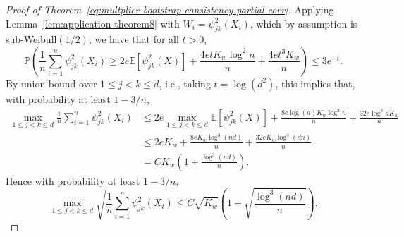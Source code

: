 \documentclass[11pt]{article}
\begin{document}
\begin{appendices}
\begin{proof}[Proof of Theorem~\ref{eq:multplier-bootstrap-consistency-partial-corr}]
Applying Lemma~\ref{lem:application-theorem8} with $W_i = \psi_{jk}^2(X_i)$, which by assumption is sub-Weibull$(1/2)$, we have that for all $t > 0$,
\[
\mathbb{P}\left(\frac{1}{n}\sum_{i=1}^n \psi_{jk}^2(X_i) \ge 2e\mathbb{E}\left[\psi_{jk}^2(X)\right] + \frac{4etK_w\log^2n}{n} + \frac{4et^3K_w}{n}\right) \le 3e^{-t}.
\]
By union bound over $1\le j < k\le d$, i.e., taking $t = \log(d^2)$, this implies that, with probability at least $1 - 3/n$,
\begin{align*}
\max_{1\le j < k\le d}\frac{1}{n}\sum_{i=1}^n \psi_{jk}^2(X_i) &\le 2e\max_{1\le j < k\le d}\mathbb{E}\left[\psi_{jk}^2(X)\right] + \frac{8e\log(d)K_w\log^2n}{n} + \frac{32e\log^3dK_w}{n}\\
&\le 2eK_w + \frac{8eK_w\log^3(nd)}{n} + \frac{32eK_w\log^3(dn)}{n}\\
&= CK_w\left(1 + \frac{\log^3(nd)}{n}\right). 
\end{align*}
Hence with probability at least $1 - 3/n$,
\begin{equation}\label{eq:square-power-psi}
\max_{1\le j < k\le d}\sqrt{\frac{1}{n}\sum_{i=1}^n \psi_{jk}^2(X_i)} \le C\sqrt{K_w}\left(1 + \sqrt{\frac{\log^3(nd)}{n}}\right).
\end{equation}





\end{proof}
\end{appendices}
\end{document}
